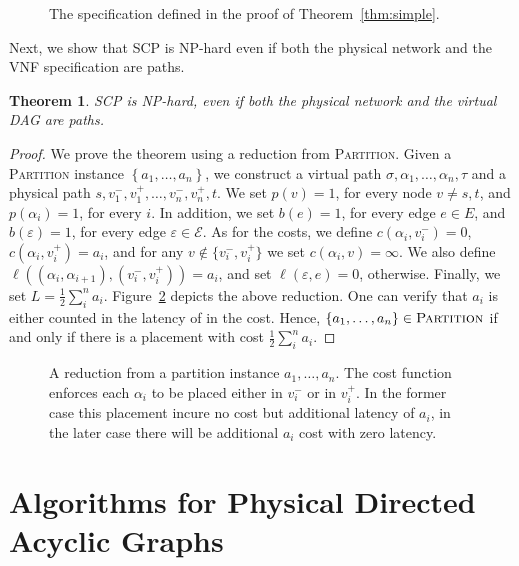 \documentclass[11pt]{article}
\newtheorem{theorem}{Theorem}
\newcommand{\set}[1]{\left\{ #1 \right\}}
\newcommand{\half}{\frac{1}{2}}
\newcommand{\eps}{\varepsilon}
\newcommand{\scp}{\textsc{SCP}\xspace}
\newcommand{\calE}{\mathcal{E}}
\begin{document}
\begin{figure}[t]
  \centering
\scalebox{1}{
  
}
\caption{The specification defined in the proof of Theorem~\ref{thm:simple}.}
\label{fig:simple}
\end{figure}

Next, we show that \scp is NP-hard even if both the physical network
and the VNF specification are paths.

\begin{theorem}
\scp is NP-hard, even if both the physical network and the virtual DAG
are paths.
\end{theorem}
\begin{proof}
We prove the theorem using a reduction from \textsc{Partition}.  Given
a \textsc{Partition} instance $\set{a_1, \ldots, a_n}$, we construct a
virtual path $\sigma, \alpha_1, \ldots, \alpha_n, \tau$ and a physical
path $s, v_1^-, v_1^+, \ldots, v_n^-, v_n^+, t$.  We set $p(v) = 1$,
for every node $v \neq s,t$, and $p(\alpha_i) = 1$, for every $i$.  In
addition, we set $b(e) = 1$, for every edge $e \in E$, and $b(\eps) =
1$, for every edge $\eps \in \calE$.
%
As for the costs, we define $c(\alpha_i, v_i^-) = 0$, $c(\alpha_i,
v_i^+) = a_i$, and for any $v \notin \{v_i^-,v_i^+\}$ we set
$c(\alpha_i, v) = \infty$.  We also define $\ell((\alpha_i,\alpha_{i+1}),
(v_i^-,v_i^+)) = a_i$, and set $\ell(\eps,e) = 0$, otherwise.  Finally,
we set $L = \half \sum_i^n a_i$.
%
Figure~\ref{fig:reduction2} depicts the above reduction.
%
One can verify that $a_i$ is either counted in the latency of in the
cost.  Hence, $\set{a_1, \ldots, a_n} \in \textsc{Partition}$ if and
only if there is a placement with cost $\half \sum_i^n a_i$.
\end{proof}


\begin{figure}[t]
\centering
\scalebox{.75}{

}
\caption{A reduction from a partition instance $a_1, \ldots, a_n$.
  The cost function enforces each $\alpha_i$ to be placed either in
  $v_i^-$ or in $v_i^+$.  In the former case this placement incure no
  cost but additional latency of $a_i$, in the later case there will
  be additional $a_i$ cost with zero latency.}
\label{fig:reduction2}
\end{figure}



\section{Algorithms for Physical Directed Acyclic Graphs}
\label{sec:algorithms}
\end{document}

